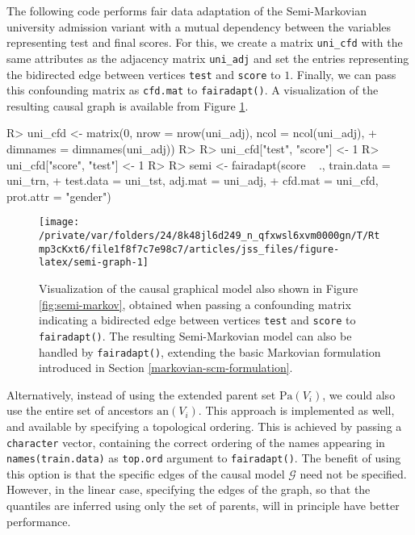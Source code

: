 \documentclass[
  nojss]{jss}
\begin{document}
The following code performs fair data adaptation of the Semi-Markovian
university admission variant with a mutual dependency between the
variables representing test and final scores. For this, we create a
matrix \texttt{uni\_cfd} with the same attributes as the adjacency
matrix \texttt{uni\_adj} and set the entries representing the bidirected
edge between vertices \texttt{test} and \texttt{score} to \(1\).
Finally, we can pass this confounding matrix as \texttt{cfd.mat} to
\texttt{fairadapt()}. A visualization of the resulting causal graph is
available from Figure \ref{fig:semi-graph}.

\begin{CodeChunk}
\begin{CodeInput}
R> uni_cfd <- matrix(0, nrow = nrow(uni_adj), ncol = ncol(uni_adj),
+                   dimnames = dimnames(uni_adj))
R> 
R> uni_cfd["test", "score"] <- 1
R> uni_cfd["score", "test"] <- 1
R> 
R> semi <- fairadapt(score ~ ., train.data = uni_trn,
+                   test.data = uni_tst, adj.mat = uni_adj,
+                   cfd.mat = uni_cfd, prot.attr = "gender")
\end{CodeInput}
\end{CodeChunk}

\begin{CodeChunk}
\begin{figure}

{\centering \texttt{[image: /private/var/folders/24/8k48jl6d249\_n\_qfxwsl6xvm0000gn/T/Rtmp3cKxt6/file1f8f7c7e98c7/articles/jss\_files/figure-latex/semi-graph-1]} 

}

\caption{Visualization of the causal graphical model also shown in Figure \ref{fig:semi-markov}, obtained when passing a confounding matrix indicating a bidirected edge between vertices \texttt{test} and \texttt{score} to \texttt{fairadapt()}. The resulting Semi-Markovian model can also be handled by \texttt{fairadapt()}, extending the basic Markovian formulation introduced in Section \ref{markovian-scm-formulation}.}\label{fig:semi-graph}
\end{figure}
\end{CodeChunk}

Alternatively, instead of using the extended parent set
\(\mathrm{Pa}(V_i)\), we could also use the entire set of ancestors
\(\mathrm{an}(V_i)\). This approach is implemented as well, and
available by specifying a topological ordering. This is achieved by
passing a \texttt{character} vector, containing the correct ordering of
the names appearing in \texttt{names(train.data)} as \texttt{top.ord}
argument to \texttt{fairadapt()}. The benefit of using this option is
that the specific edges of the causal model \(\mathcal{G}\) need not be
specified. However, in the linear case, specifying the edges of the
graph, so that the quantiles are inferred using only the set of parents,
will in principle have better performance.
\end{document}
